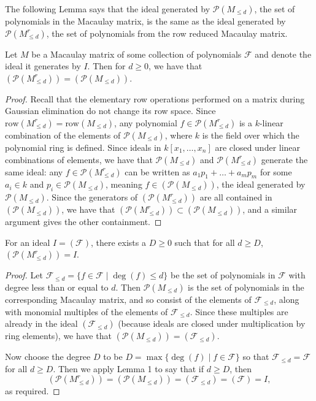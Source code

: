 \documentclass[12pt]{article}
\newenvironment{lemma}[2][Lemma]{\begin{trivlist}
\item[\hskip \labelsep {\bfseries #1}\hskip \labelsep {\bfseries #2.}]}{\end{trivlist}}
\newenvironment{corollary}[2][Corollary]{\begin{trivlist}
\item[\hskip \labelsep {\bfseries #1}\hskip \labelsep {\bfseries #2.}]}{\end{trivlist}}
\newcommand{\Poly}{\mathscr{P}}
\newcommand{\row}{\text{row}}
\newcommand{\F}{\mathcal{F}}
\begin{document}
The following Lemma says that the ideal generated by $\Poly(M_{\leq d})$, the set of polynomials in the Macaulay matrix, is the same as the ideal generated by $\Poly(M_{\leq d}^r)$, the set of polynomials from the row reduced Macaulay matrix.


\begin{lemma}{1}
	Let $M$ be a Macaulay matrix of some collection of polynomials $\F$ and denote the ideal it generates by $I$. Then for $d \geq 0$, we have that $(\Poly(M_{\leq d}^r)) = (\Poly(M_{\leq d}))$. 
\end{lemma}

\begin{proof}
	Recall that the elementary row operations performed on a matrix during Gaussian elimination do not change its row space. Since $\row(M_{\leq d}^r) = \row(M_{\leq d})$, any polynomial $f \in \Poly(M_{\leq d}^r)$ is a $k$-linear combination of the elements of $\Poly(M_{\leq d})$, where $k$ is the field over which the polynomial ring is defined. Since ideals in $k[x_1, \dots, x_n]$ are closed under linear combinations of elements, we have that $\Poly(M_{\leq d})$ and $\Poly(M_{\leq d}^r)$ generate the same ideal: any $f \in \Poly(M_{\leq d}^r)$ can be written as $a_1 p_1 + \dots + a_m p_m$ for some $a_i \in k$ and $p_i \in \Poly(M_{\leq d})$, meaning $f \in (\Poly(M_{\leq d}))$, the ideal generated by $\Poly(M_{\leq d})$. Since the generators of $(\Poly(M_{\leq d}^r))$ are all contained in $(\Poly(M_{\leq d}))$, we have that $(\Poly(M_{\leq d}^r)) \subset (\Poly(M_{\leq d}))$, and a similar argument gives the other containment. 
\end{proof}


\begin{corollary}{1}
	For an ideal $I = (\F)$, there exists a $D \geq 0$ such that for all $d \geq D$, $(\Poly(M_{\leq d}^r)) = I$. 
\end{corollary}

\begin{proof}
	Let $\F_{\leq d} = \{f \in \F \mid \deg(f) \leq d\}$ be the set of polynomials in $\F$ with degree less than or equal to $d$. Then $\Poly(M_{\leq d})$ is the set of polynomials in the corresponding Macaulay matrix, and so consist of the elements of $\F_{\leq d}$, along with monomial multiples of the elements of $\F_{\leq d}$. Since these multiples are already in the ideal $(\F_{\leq d})$ (because ideals are closed under multiplication by ring elements), we have that $(\Poly(M_{\leq d})) = (\F_{\leq d})$. 

	Now choose the degree $D$ to be $D = \max \{\deg(f) \mid f \in \F\}$ so that $\F_{\leq d} = \F$ for all $d \geq D$. Then we apply Lemma 1 to say that if $d \geq D$, then \[ (\Poly(M_{\leq d}^r)) = (\Poly(M_{\leq d})) = (\F_{\leq d}) = (\F) = I, \] as required.
\end{proof}
\end{document}
